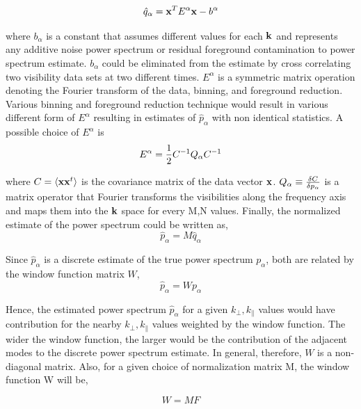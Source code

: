 \documentclass[twocolumn]{emulateapj}
\begin{document}
\begin{equation}
\hat q_{\alpha} = \bold x^{T} E^{\alpha} \bold x  - b^{\alpha}
\end{equation}

where $b_{\alpha}$ is a constant that assumes different values for each $\bold k$ and represents any additive noise power spectrum or residual foreground contamination to power spectrum estimate. $b_{\alpha}$ could be eliminated from the estimate by cross correlating two visibility data sets at two different times. $E^{\alpha}$ is a symmetric matrix operation denoting the Fourier transform of the data, binning, and foreground reduction. Various binning and foreground reduction technique would result in various different form of $E^{\alpha}$ resulting in estimates of $\hat p_{\alpha}$ with non identical statistics. A possible choice of $E^{\alpha}$ is
\begin{equation}
E^{\alpha} =  {1 \over 2} C^{-1} Q_{\alpha} C^{-1}
\end{equation} 

where $C = \langle \bold x \bold x^{t} \rangle$ is the covariance matrix of the data vector $\bold x$. $Q_{\alpha} \equiv {\delta C \over \delta p_{\alpha} } $ is a matrix operator that Fourier transforms the visibilities along the frequency axis and maps them into the $\bold k$ space for every M,N values. Finally, the normalized estimate of the power spectrum could be written as,  
\begin{equation}
\hat p_{\alpha} = M \hat q_{\alpha} 
\end{equation} 

Since $\hat p_{\alpha}$ is a discrete estimate of the true power spectrum $p_{\alpha}$, both are related by the window function matrix $W$, 
\begin{equation}
\hat p_{\alpha} = W p_{\alpha}
\end{equation} 

Hence, the estimated power spectrum $\hat p_{\alpha}$ for a given $k_{\perp}, k_{\parallel}$ values would have contribution for the nearby $k_{\perp}, k_{\parallel}$ values weighted by the window function. The wider the window function, the larger would be the contribution of the adjacent modes to the discrete power spectrum estimate. In general, therefore, $W$ is a non-diagonal matrix. Also, for a given choice of normalization matrix M, the window function W will be, 

\begin{equation}
 W = MF
\end{equation} 
\end{document}
